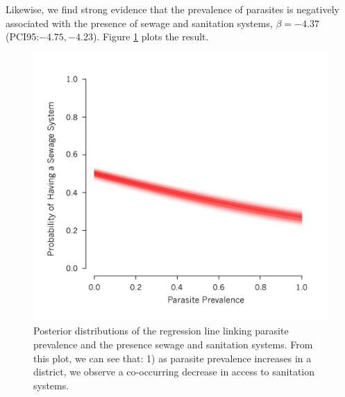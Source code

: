 \documentclass[12pt]{article}
\begin{document}
Likewise, we find strong evidence that the prevalence of parasites is negatively associated with the presence of sewage and sanitation systems, $\beta=-4.37$ (PCI95:$ -4.75, -4.23$). Figure \ref{resSewer} plots the result.\\
 \begin{figure}
\caption{\label{resSewer} Posterior distributions of the regression line linking parasite prevalence and the presence sewage and sanitation systems. From this plot, we can see that: 1) as parasite prevalence increases in a district, we observe a co-occurring decrease in access to sanitation systems.}
\includegraphics[width=5in]{Figures/SewerModel} 
\end{figure}
\end{document}
